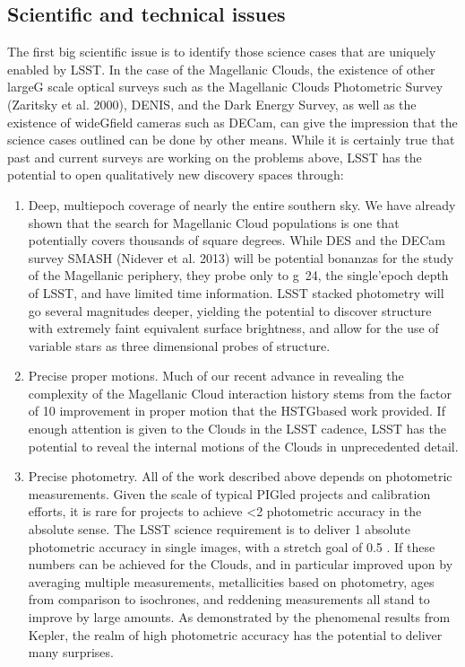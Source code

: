 \subsection{Scientific and technical issues}
 The first big scientific issue is to identify those science cases that are uniquely  enabled by LSST.  In the case of the Magellanic Clouds, the existence of other largeG 
scale optical surveys such as the Magellanic Clouds Photometric Survey (Zaritsky et  al. 2000), DENIS, and the Dark Energy Survey, as well as the existence of wideGfield  cameras such as DECam, can give the impression that the science cases outlined can  be done by other means.  While it is certainly true that past and current surveys are  working on the problems above, LSST has the potential to open qualitatively new  discovery spaces through:  
\begin{enumerate}
\item{ Deep, multiepoch coverage of nearly the entire southern sky.  We have  
already shown that the search for Magellanic Cloud populations is one that  potentially covers thousands of square degrees.  While DES and the DECam  survey SMASH (Nidever et al. 2013) will be potential bonanzas for the study  of the Magellanic periphery, they probe only to g~24, the single'epoch depth  of LSST, and have limited time information.  LSST stacked photometry will go  several magnitudes deeper, yielding the potential to discover structure with  extremely faint equivalent surface brightness, and allow for the use of  variable stars as three dimensional probes of structure.  }

\item{Precise proper motions.  Much of our recent advance in revealing the  complexity of the Magellanic Cloud interaction history stems from the factor  of 10 improvement in proper motion that the HSTGbased work provided.  If  enough attention is given to the Clouds in the LSST cadence, LSST has the  potential to reveal the internal motions of the Clouds in unprecedented detail.  }

\item{Precise photometry.  All of the work described above depends on  photometric measurements.  Given the scale of typical PIGled projects and  calibration efforts, it is rare for projects to achieve <2  photometric  accuracy in the absolute sense.  The LSST science requirement is to deliver  1  absolute photometric accuracy in single images, with a stretch goal of  0.5 .  If these numbers can be achieved for the Clouds, and in particular  improved upon by averaging multiple measurements, metallicities based on  photometry, ages from comparison to isochrones, and reddening  measurements all stand to improve by large amounts.  As demonstrated by  the phenomenal results from Kepler, the realm of high photometric accuracy  has the potential to deliver many surprises.  }
\end{enumerate}

